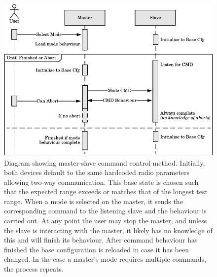 \begin{figure}[p]
    \centering
    \includegraphics{Figures/software_cmd_system}
    \caption[Master-Slave command control method]{
    	Diagram showing master-slave command control method. Initially, both devices default to the same hardcoded radio parameters allowing two-way communication. This base state is chosen such that the expected range exceeds or matches that of the longest test range. When a mode is selected on the master, it sends the corresponding command to the listening slave and the behaviour is carried out. At any point the user may stop the master, and unless the slave is interacting with the master, it likely has no knowledge of this and will finish its behaviour. After command behaviour has finished the base configuration is reloaded in case it has been changed. In the case a master's mode requires multiple commands, the process repeats.
    }
    \label{fig:software_cmd_system}
\end{figure}
